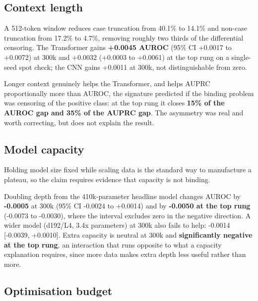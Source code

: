 \documentclass[10pt,twocolumn,letterpaper]{article}
\begin{document}
\subsection{Context length}\label{sec:5.1}



A 512-token window reduces case truncation from 40.1\% to 14.1\% and non-case truncation from 17.2\% to 4.7\%, removing roughly two thirds of the differential censoring. The Transformer gains \textbf{+0.0045 AUROC} (95\% CI +0.0017 to +0.0072) at 300k and +0.0032 (+0.0003 to +0.0061) at the top rung on a single-seed spot check; the CNN gains +0.0011 at 300k, not distinguishable from zero.



Longer context genuinely helps the Transformer, and helps AUPRC proportionally more than AUROC, the signature predicted if the binding problem was censoring of the positive class: at the top rung it closes \textbf{15\% of the AUROC gap and 35\% of the AUPRC gap}. The asymmetry was real and worth correcting, but does not explain the result.



\subsection{Model capacity}\label{sec:5.2}



Holding model size fixed while scaling data is the standard way to manufacture a plateau, so the claim requires evidence that capacity is not binding.



Doubling depth from the 410k-parameter headline model changes AUROC by \textbf{-0.0005} at 300k (95\% CI -0.0024 to +0.0014) and by \textbf{-0.0050 at the top rung} (-0.0073 to -0.0030), where the interval excludes zero in the negative direction. A wider model (d192/L4, 3.4x parameters) at 300k also fails to help: -0.0014 [-0.0039, +0.0010]. Extra capacity is neutral at 300k and \textbf{significantly negative at the top rung}, an interaction that runs opposite to what a capacity explanation requires, since more data makes extra depth less useful rather than more.



\subsection{Optimisation budget}\label{sec:5.3}
\end{document}
